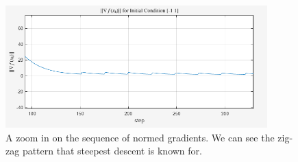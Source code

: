 \begin{figure}
    \centering
    \includegraphics[width = 0.9\textwidth]{Plots/NormGradient1000_zoomin.png}
    \caption{A zoom in on the sequence of normed gradients. We can see the zig-zag pattern that steepest descent is known for.}
    \label{fig:Zoomin}
\end{figure}
